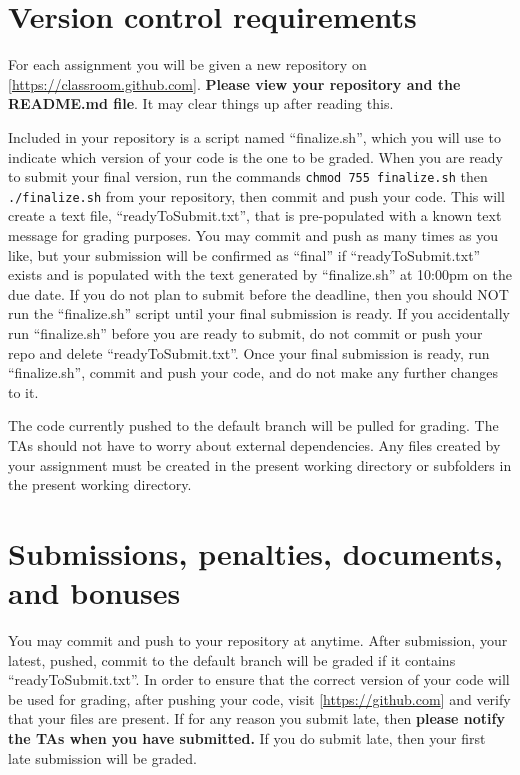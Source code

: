 \documentclass{article}
\begin{document}
\section*{Version control requirements}
For each assignment you will be given a new repository on [\url{https://classroom.github.com}]. \textbf{Please view your repository and the README.md file}. It may clear things up after reading this.

Included in your repository is a script named ``finalize.sh'', which you will use to indicate which version of your code is the one to be graded. When you are ready to submit your final version, run the commands \texttt{chmod 755 finalize.sh} then \texttt{./finalize.sh} from your repository, then commit and push your code. This will create a text file, ``readyToSubmit.txt'', that is pre-populated with a known text message for grading purposes. You may commit and push as many times as you like, but your submission will be confirmed as ``final'' if ``readyToSubmit.txt'' exists and is populated with the text generated by ``finalize.sh'' at 10:00pm on the due date. If you do not plan to submit before the deadline, then you should NOT run the ``finalize.sh'' script until your final submission is ready. If you accidentally run ``finalize.sh'' before you are ready to submit, do not commit or push your repo and delete ``readyToSubmit.txt''. Once your final submission is ready, run ``finalize.sh'', commit and push your code, and do not make any further changes to it.

The code currently pushed to the default branch will be pulled for grading. The TAs should not have to worry about external dependencies. Any files created by your assignment must be created in the present working directory or subfolders in the present working directory.

\section*{Submissions, penalties, documents, and bonuses}
You may commit and push to your repository at anytime. After submission, your latest, pushed, commit to the default branch will be graded if it contains ``readyToSubmit.txt''. In order to ensure that the correct version of your code will be used for grading, after pushing your code, visit [\url{https://github.com}] and verify that your files are present. If for any reason you submit late, then \textbf{please notify the TAs when you have submitted.} If you do submit late, then your first late submission will be graded.
\end{document}

